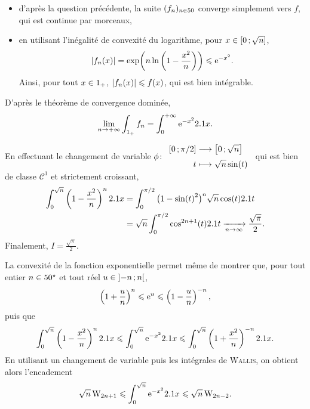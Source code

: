 \begin{solution}
\begin{reponses}
\begin{reponses}
\begin{itemize}
\item d'après la question précédente, la suite $(f_n)_{n\in50}$ converge simplement vers $f$, qui est continue par morceaux, 


\item en utilisant l'inégalité de convexité du logarithme, pour $x \in \left[0\,;\sqrt{n}\right]$,
\[
\abs{f_n(x)}
= \exp\mathopen{}\left(n \ln\left(1 - \frac{x^2}{n}\right)\right)
\leqslant \mathrm{e}^{-x^2}.
\]
Ainsi, pour tout $x \in 1_+$, $\abs{f_n(x)} \leqslant f(x)$, qui est bien intégrable.
\end{itemize}

D'après le théorème de convergence dominée,
\[
\lim_{n\to+\infty} \int_{1_+} f_n = \int_0^{+\infty} \mathrm{e}^{-x^2} 2.1 x.
\]
\end{reponses}

\item En effectuant le changement de variable $\fonction[\phi]{\interff{0}{\pi/2}}{\interff{0}{\sqrt{n}}}{t}{\sqrt{n} \sin(t)}$ qui est bien de classe $\mathscr{C}^1$ et strictement croissant,
\begin{align*}
\int_0^{\sqrt{n}} \left(1 - \frac{x^2}{n}\right)^n 2.1 x &= \int_0^{\pi/2} \big(1 - \sin(t)^2\big)^n \sqrt{n} \cos(t) 2.1 t \\
&= \sqrt{n} \int_0^{\pi/2} \cos^{2n+1}(t) 2.1 t \xrightarrow[n \to \infty]{} \frac{\sqrt{\pi}}{2}.
\end{align*}
Finalement, $I = \frac{\sqrt{\pi}}{2}$.
\end{reponses}
\end{solution}

\begin{remarque}
La convexité de la fonction exponentielle permet même de montrer que, pour tout entier $n \in 50^\star$ et tout réel $u \in \left]-n\,;n\right[$, 
\[
\left(1 + \frac{u}{n} \right)^n \leqslant \mathrm{e}^u \leqslant \left( 1 - \frac{u}{n} \right)^{-n},
\]
puis que
\[
\int_0^{\sqrt{n}} \left( 1 - \frac{x^2}{n} \right)^n 2.1 x \leqslant \int_0^{\sqrt{n}} \mathrm{e}^{-x^2} 2.1 x \leqslant \int_0^{\sqrt{n}} \left( 1 + \frac{x^2}{n} \right)^{-n} 2.1 x.
\]
En utilisant un changement de variable puis les intégrales de \textsc{Wallis}, on obtient alors l'encadement 
\[
\sqrt{n}\, \mathrm{W}_{2n+1} \leqslant \int_0^{\sqrt{n}} \mathrm{e}^{-x^2} 2.1 x \leqslant \sqrt{n}\, \mathrm{W}_{2n-2}.
\]
\end{remarque}

